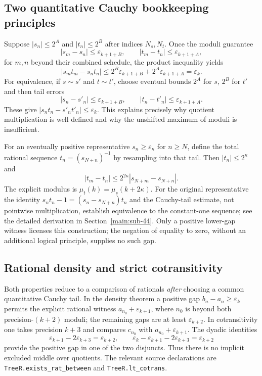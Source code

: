 \documentclass[11pt,reqno]{amsart}
\theoremstyle{definition}\newtheorem{definition}[theorem]{Definition}
\theoremstyle{remark}\newtheorem{remark}[theorem]{Remark}
\newcommand{\eps}{\varepsilon}
\begin{document}
\subsection{Two quantitative Cauchy bookkeeping principles}
Suppose $|s_n|\le2^A$ and $|t_n|\le2^B$ after indices $N_s,N_t$. Once the moduli guarantee
\[
 |s_m-s_n|\le\eps_{k+1+B},\qquad
 |t_m-t_n|\le\eps_{k+1+A},
\]
for $m,n$ beyond their combined schedule, the product inequality yields
\[
 |s_mt_m-s_nt_n|\le 2^B\eps_{k+1+B}+2^A\eps_{k+1+A}=\eps_k.
\]
For equivalence, if $s\sim s'$ and $t\sim t'$, choose eventual bounds $2^A$ for $s$, $2^B$ for $t'$ and then tail errors
\[
 |s_n-s'_n|\le\eps_{k+1+B},\qquad
 |t_n-t'_n|\le\eps_{k+1+A}.
\]
These give $|s_nt_n-s'_nt'_n|\le\eps_k$. This explains precisely why quotient multiplication is well defined and why the unshifted maximum of moduli is insufficient.

For an eventually positive representative $s_n\ge\eps_\kappa$ for $n\ge N$, define the total rational sequence $t_n=(s_{N+n})^{-1}$ by resampling into that tail. Then $|t_n|\le2^\kappa$ and
\[
 |t_m-t_n|\le2^{2\kappa}|s_{N+m}-s_{N+n}|.
\]
The explicit modulus is $\mu_t(k)=\mu_s(k+2\kappa)$. For the original representative the identity $s_nt_n-1=(s_n-s_{N+n})t_n$ and the Cauchy-tail estimate, not pointwise multiplication, establish equivalence to the constant-one sequence; see the detailed derivation in Section~\ref{main:sub-44}. Only a positive lower-gap witness licenses this construction; the negation of equality to zero, without an additional logical principle, supplies no such gap.

\subsection{Rational density and strict cotransitivity}
Both properties reduce to a comparison of rationals \emph{after} choosing a common quantitative Cauchy tail. In the density theorem a positive gap $b_n-a_n\ge\eps_k$ permits the explicit rational witness $a_{n_0}+\eps_{k+1}$, where $n_0$ is beyond both precision-$(k+2)$ moduli; the remaining gaps are at least $\eps_{k+2}$. In cotransitivity one takes precision $k+3$ and compares $c_{n_0}$ with $a_{n_0}+\eps_{k+1}$. The dyadic identities
\[
 \eps_{k+1}-2\eps_{k+3}=\eps_{k+2},\qquad
 \eps_k-\eps_{k+1}-2\eps_{k+3}=\eps_{k+2}
\]
provide the positive gap in one of the two disjuncts. Thus there is no implicit excluded middle over quotients. The relevant source declarations are \texttt{TreeR.exists\_rat\_between} and \texttt{TreeR.lt\_cotrans}.
\end{document}
